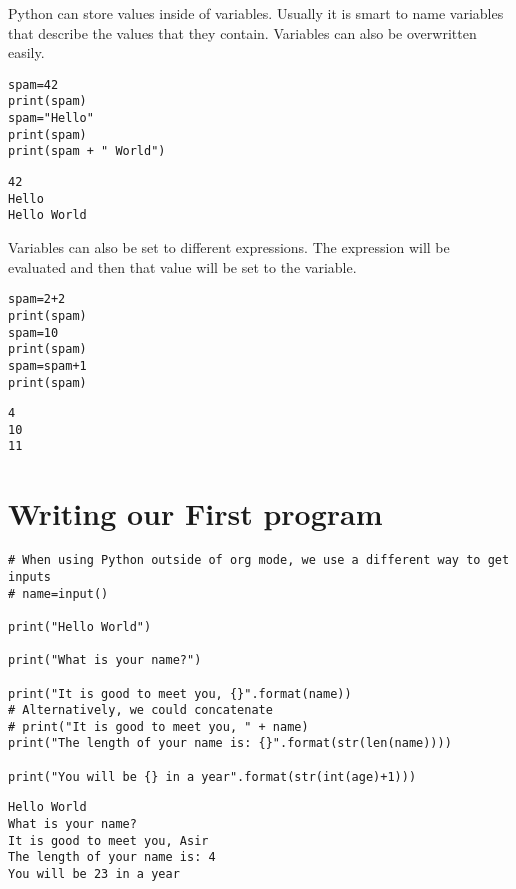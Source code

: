 \documentclass[11pt]{article}
\begin{document}
Python can store values inside of variables. Usually it is smart to name variables that describe the values that they contain. Variables can also be overwritten easily.

\begin{verbatim}
spam=42
print(spam)
spam="Hello"
print(spam)
print(spam + " World")
\end{verbatim}

\begin{verbatim}
42
Hello
Hello World
\end{verbatim}


Variables can also be set to different expressions. The expression will be evaluated and then that value will be set to the variable.

\begin{verbatim}
spam=2+2
print(spam)
spam=10
print(spam)
spam=spam+1
print(spam)
\end{verbatim}

\begin{verbatim}
4
10
11
\end{verbatim}

\section{Writing our First program}
\label{sec:org892bd00}

\begin{verbatim}
# When using Python outside of org mode, we use a different way to get inputs
# name=input()

print("Hello World")

print("What is your name?")

print("It is good to meet you, {}".format(name))
# Alternatively, we could concatenate
# print("It is good to meet you, " + name)
print("The length of your name is: {}".format(str(len(name))))

print("You will be {} in a year".format(str(int(age)+1)))
\end{verbatim}

\begin{verbatim}
Hello World
What is your name?
It is good to meet you, Asir
The length of your name is: 4
You will be 23 in a year
\end{verbatim}
\end{document}
